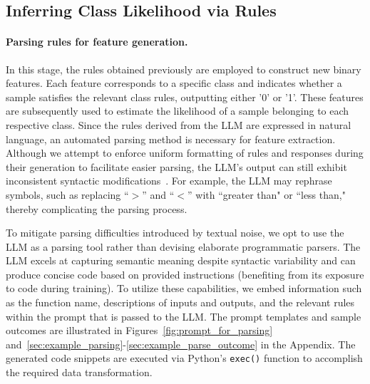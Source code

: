 \subsection{Inferring Class Likelihood via Rules}
\label{Sec:training}

\paragraph{Parsing rules for feature generation.} In this stage, the rules obtained previously are employed to construct new binary features. Each feature corresponds to a specific class and indicates whether a sample satisfies the relevant class rules, outputting either '0' or '1'. These features are subsequently used to estimate the likelihood of a sample belonging to each respective class. Since the rules derived from the LLM are expressed in natural language, an automated parsing method is necessary for feature extraction. Although we attempt to enforce uniform formatting of rules and responses during their generation to facilitate easier parsing, the LLM’s output can still exhibit inconsistent syntactic modifications~\cite{kovavc2023large}. For example, the LLM may rephrase symbols, such as replacing ``$>$” and ``$<$” with ``greater than" or ``less than," thereby complicating the parsing process.

To mitigate parsing difficulties introduced by textual noise, we opt to use the LLM as a parsing tool rather than devising elaborate programmatic parsers. The LLM excels at capturing semantic meaning despite syntactic variability and can produce concise code based on provided instructions (benefiting from its exposure to code during training). To utilize these capabilities, we embed information such as the function name, descriptions of inputs and outputs, and the relevant rules within the prompt that is passed to the LLM. The prompt templates and sample outcomes are illustrated in Figures~\ref{fig:prompt_for_parsing} and~\ref{sec:example_parsing}-\ref{sec:example_parse_outcome} in the Appendix. The generated code snippets are executed via Python’s \texttt{exec()} function to accomplish the required data transformation.

\vspace*{-0.12in}
